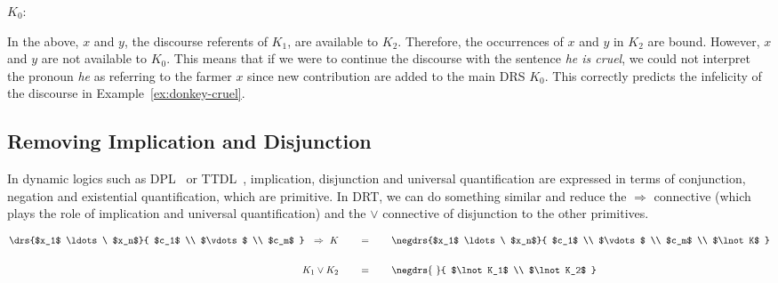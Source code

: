 \begin{flushleft}
  $K_0$: \hspace{-42mm} 
\end{flushleft}

In the above, $x$ and $y$, the discourse referents of $K_1$, are available
to $K_2$. Therefore, the occurrences of $x$ and $y$ in $K_2$ are
bound. However, $x$ and $y$ are not available to $K_0$. This means that if
we were to continue the discourse with the sentence \emph{he is cruel}, we
could not interpret the pronoun \emph{he} as referring to the farmer $x$
since new contribution are added to the main DRS $K_0$. This correctly
predicts the infelicity of the discourse in Example~\ref{ex:donkey-cruel}.

\begin{exe}
\end{exe}


\subsection{Removing Implication and Disjunction}
\label{ssec:drt-implication-disjunction}

In dynamic logics such as DPL~\cite{groenendijk1991dynamic} or
TTDL~\cite{de2006towards,lebedeva2012expression}, implication, disjunction
and universal quantification are expressed in terms of conjunction,
negation and existential quantification, which are primitive. In DRT, we
can do something similar and reduce the $\Rightarrow$ connective (which
plays the role of implication and universal quantification) and the $\lor$
connective of disjunction to the other primitives.

\begin{align*}
\drs{$x_1$ \ldots\ $x_n$}{
  $c_1$ \\
  $\vdots$ \\
  $c_m$ 
}~~
\Rightarrow~
K
\qquad &= \qquad
\negdrs{$x_1$ \ldots\ $x_n$}{
  $c_1$ \\
  $\vdots$ \\
  $c_m$ \\
  $\lnot K$
} \\
  \\
K_1 \lor K_2
\qquad &= \qquad
\negdrs{\ }{
  $\lnot K_1$ \\
  $\lnot K_2$
}
\end{align*}


